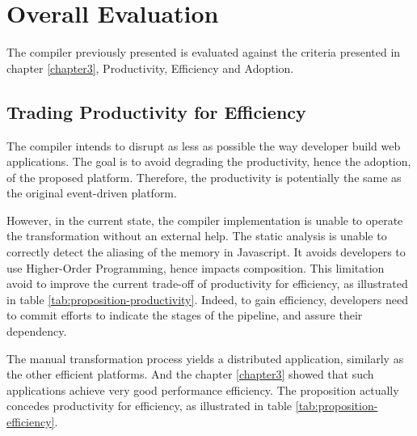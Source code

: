 \section{Overall Evaluation} \label{chapter4:evaluation}

The compiler previously presented is evaluated against the criteria presented in chapter \ref{chapter3}, Productivity, Efficiency and Adoption.

\subsection{Trading Productivity for Efficiency}


The compiler intends to disrupt as less as possible the way developer build web applications.
The goal is to avoid degrading the productivity, hence the adoption, of the proposed platform.
Therefore, the productivity is potentially the same as the original event-driven platform.

However, in the current state, the compiler implementation is unable to operate the transformation without an external help.
The static analysis is unable to correctly detect the aliasing of the memory in Javascript.
It avoids developers to use Higher-Order Programming, hence impacts composition.
This limitation avoid to improve the current trade-off of productivity for efficiency, as illustrated in table \ref{tab:proposition-productivity}.
Indeed, to gain efficiency, developers need to commit efforts to indicate the stages of the pipeline, and assure their dependency.


The manual transformation process yields a distributed application, similarly as the other efficient platforms.
And the chapter \ref{chapter3} showed that such applications achieve very good performance efficiency.
The proposition actually concedes productivity for efficiency, as illustrated in table \ref{tab:proposition-efficiency}.


